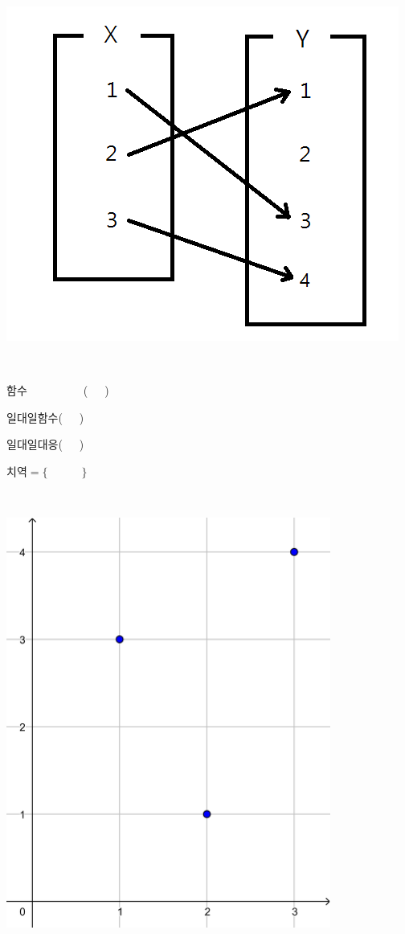 \documentclass[a4paper]{oblivoir}
\begin{document}
%
\begin{minipage}{0.4\textwidth}
\includegraphics[width=\textwidth]{onetoonefunction}
\end{minipage}
~
\begin{minipage}{0.20\textwidth}
함수~~~~~~~~~~(~~~)\par\bigskip
일대일함수(~~~)\par\bigskip
일대일대응(~~~)\par\bigskip
치역\(=\{\qquad\quad\}\)
\end{minipage}
~
\begin{minipage}{0.35\textwidth}
\includegraphics[width=0.8\textwidth]{onetoonefunction-}
\end{minipage}
\end{document}
